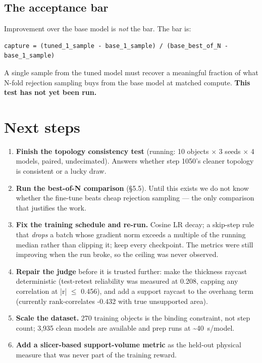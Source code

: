 \documentclass[11pt,a4paper]{article}
\begin{document}
\subsection{The acceptance bar}
Improvement over the base model is \textit{not} the bar. The bar is:

\begin{Verbatim}[fontsize=\small,frame=leftline,framerule=1pt,xleftmargin=8pt]
capture = (tuned_1_sample - base_1_sample) / (base_best_of_N - base_1_sample)
\end{Verbatim}
A single sample from the tuned model must recover a meaningful fraction of what N-fold rejection
sampling buys from the base model at matched compute. \textbf{This test has not yet been run.}

\section{Next steps}
\begin{enumerate}\itemsep3pt
  \item \textbf{Finish the topology consistency test} (running: 10 objects $\times$ 3 seeds $\times$ 4 models, paired,
undecimated). Answers whether step 1050's cleaner topology is consistent or a lucky draw.
  \item \textbf{Run the best-of-N comparison} (\S{}5.5). Until this exists we do not know whether the fine-tune
beats cheap rejection sampling --- the only comparison that justifies the work.
  \item \textbf{Fix the training schedule and re-run.} Cosine LR decay; a skip-step rule that \textit{drops} a batch
whose gradient norm exceeds a multiple of the running median rather than clipping it; keep every
checkpoint. The metrics were still improving when the run broke, so the ceiling was never observed.
  \item \textbf{Repair the judge} before it is trusted further: make the thickness raycast deterministic
(test-retest reliability was measured at 0.208, capping any correlation at |r| $\leq$ 0.456), and add a
support raycast to the overhang term (currently rank-correlates -0.432 with true unsupported area).
  \item \textbf{Scale the dataset.} 270 training objects is the binding constraint, not step count; 3,935 clean
models are available and prep runs at \textasciitilde{}40~s/model.
  \item \textbf{Add a slicer-based support-volume metric} as the held-out physical measure that was never part
of the training reward.
\end{enumerate}
\end{document}
